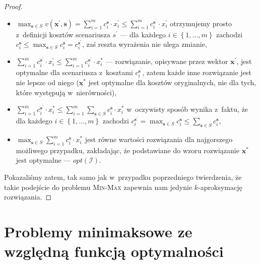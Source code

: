\begin{proof}
	\begin{itemize}
		\item $\max_{\textbf{s} \in S} v \left( \textbf{x}^{\prime}, \textbf{s} \right) = \sum_{i = 1}^{m} c_{i}^{\textbf{s}} \cdot x_{i}^{\prime} \leqslant \sum_{i = 1}^{m} c_{i}^{\textbf{s}^{\prime}} \cdot x_{i}^{\prime}$ otrzymujemy prosto z~definicji kosztów scenariusza $s^{\prime}$ --- dla każdego $i \in \left\{ 1, \dots, m \right\}$ zachodzi $c_{i}^{\textbf{s}} \leqslant \max_{\textbf{s} \in S} c^{\textbf{s}}_{i} = c_{i}^{\textbf{s}^{\prime}}$, zaś reszta wyrażenia nie ulega zmianie,
		\item $\sum_{i = 1}^{m} c_{i}^{\textbf{s}^{\prime}} \cdot x_{i}^{\prime} \leqslant \sum_{i = 1}^{m} c_{i}^{\textbf{s}^{\prime}} \cdot x_{i}^{\ast}$ --- rozwiązanie, opisywane przez wektor $\textbf{x}^{\prime}$, jest optymalne dla scenariusza z~kosztami $c_{i}^{\textbf{s}^{\prime}}$, zatem każde inne rozwiązanie jest nie lepsze od niego ($\textbf{x}^{\ast}$ jest optymalne dla kosztów oryginalnych, nie dla tych, które występują w~nierówności),
		\item $\sum_{i = 1}^{m} c_{i}^{\textbf{s}^{\prime}} \cdot x_{i}^{\ast} \leqslant \sum_{i = 1}^{m} \sum_{\textbf{s} \in S} c_{i}^{\textbf{s}} \cdot x_{i}^{\ast}$ w~oczywisty sposób wynika z~faktu, że dla każdego $i \in \left\{ 1, \dots, m \right\}$ zachodzi $c_{i}^{\textbf{s}^{\prime}} = \max_{\textbf{s} \in S} c^{\textbf{s}}_{i} \leqslant \sum_{\textbf{s} \in S} c^{\textbf{s}}_{i}$,
		\item $\max_{\textbf{s} \in S} \sum_{i = 1}^{m} c_{i}^{\textbf{s}} \cdot x_{i}^{\ast}$ jest równe wartości rozwiązania dla najgorszego możliwego przypadku, zakładając, że podstawiane do wzoru rozwiązanie $\textbf{x}^{\ast}$ jest optymalne --- $ opt \left( \mathcal{I} \right)$.
	\end{itemize}
	
	Pokazaliśmy zatem, tak samo jak w~przypadku poprzedniego twierdzenia, że takie podejście do problemu \textsc{Min-Max} zapewnia nam jedynie $k$-aproksymację rozwiązania.
\end{proof}




\section{Problemy minimaksowe ze względną funkcją optymalności}




